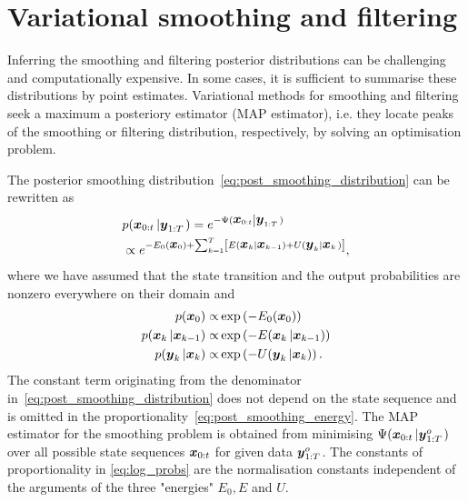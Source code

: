 \documentclass[10pt,a4paper, twocolumn]{article}
\renewcommand{\vec}[1]{{\mbox{\mathversion{bold}\ensuremath{#1}}}}
\begin{document}
\section{Variational smoothing and filtering}
Inferring the smoothing and filtering posterior distributions can be  challenging and computationally expensive. In some cases, it is sufficient to summarise these distributions by point estimates. Variational methods for smoothing and filtering seek a maximum a posteriory estimator (MAP estimator), i.e. they  locate peaks of the smoothing or filtering distribution, respectively, by solving an optimisation problem.

The posterior smoothing distribution~\eqref{eq:post_smoothing_distribution} can be rewritten as
%
\begin{align}\label{eq:post_smoothing_energy}
&p(\vec{x}_{0:t}\left|\vec{y}_{1:T} \right.) = e^{-\Psi(\vec{x}_{0:t}\left|\vec{y}_{1:T} \right.)} \nonumber \\
&\propto e^{- E_0(\vec{x}_0)+\sum_{k=1}^T \left[E(\vec{x}_k\left |\vec{x}_{k-1}\right) + U(\vec{y}_k\left|\vec{x}_k\right.)\right]},\nonumber \\
\end{align}
%
where we have assumed that the state transition and the output probabilities are nonzero everywhere on their domain and
\begin{align}\label{eq:log_probs}
p(\vec{x}_0) \propto& \exp\left(-E_0(\vec{x}_0)\right) \nonumber\\
p(\vec{x}_k\left |\vec{x}_{k-1}\right)\propto& \exp\left(-E(\vec{x}_k\left |\vec{x}_{k-1}\right)\right) \nonumber\\
p(\vec{y}_k\left |\vec{x}_k\right)\propto& \exp\left(-U(\vec{y}_k\left |\vec{x}_k\right)\right).
\end{align}
The constant term originating from the denominator in~\eqref{eq:post_smoothing_distribution} does not depend on the state sequence and is omitted in the proportionality~\eqref{eq:post_smoothing_energy}. The MAP estimator for the smoothing problem is obtained from minimising 
$\Psi(\vec{x}_{0:t}\left|\vec{y}^o_{1:T} \right.)$ over all possible state sequences $\vec{x}_{0:t}$ for given data $\vec{y}^o_{1:T}$. The constants of proportionality in \eqref{eq:log_probs} are the normalisation constants independent of the arguments of the three "energies" $E_0, E$ and $U$. 
\end{document}
